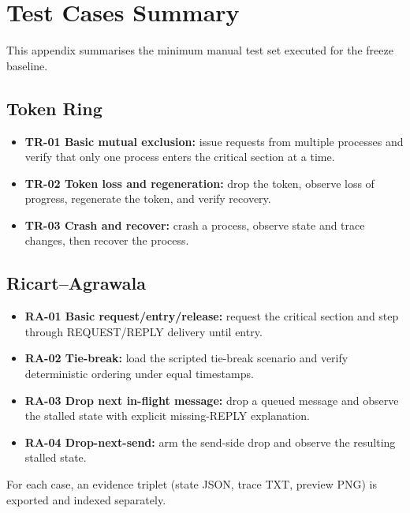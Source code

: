 \chapter{Test Cases Summary}
\label{app:test-cases}

This appendix summarises the minimum manual test set executed for the freeze baseline.

\section{Token Ring}
\begin{itemize}
  \item \textbf{TR-01 Basic mutual exclusion:} issue requests from multiple processes and verify that only one process enters the critical section at a time.
  \item \textbf{TR-02 Token loss and regeneration:} drop the token, observe loss of progress, regenerate the token, and verify recovery.
  \item \textbf{TR-03 Crash and recover:} crash a process, observe state and trace changes, then recover the process.
\end{itemize}

\section{Ricart--Agrawala}
\begin{itemize}
  \item \textbf{RA-01 Basic request/entry/release:} request the critical section and step through REQUEST/REPLY delivery until entry.
  \item \textbf{RA-02 Tie-break:} load the scripted tie-break scenario and verify deterministic ordering under equal timestamps.
  \item \textbf{RA-03 Drop next in-flight message:} drop a queued message and observe the stalled state with explicit missing-REPLY explanation.
  \item \textbf{RA-04 Drop-next-send:} arm the send-side drop and observe the resulting stalled state.
\end{itemize}

For each case, an evidence triplet (state JSON, trace TXT, preview PNG) is exported and indexed separately.